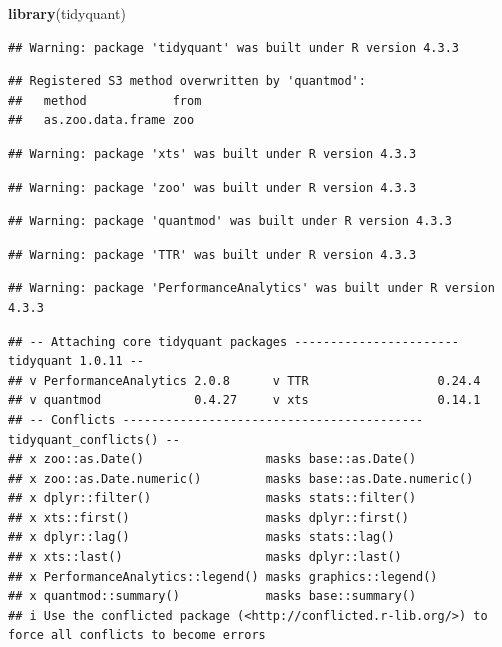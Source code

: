 \documentclass[
]{article}
\newenvironment{Shaded}{\begin{snugshade}}{\end{snugshade}}
\newcommand{\FunctionTok}[1]{\textcolor[rgb]{0.13,0.29,0.53}{\textbf{#1}}}
\newcommand{\NormalTok}[1]{#1}
\begin{document}
\begin{Shaded}
\begin{Highlighting}[]
\FunctionTok{library}\NormalTok{(tidyquant)}
\end{Highlighting}
\end{Shaded}

\begin{verbatim}
## Warning: package 'tidyquant' was built under R version 4.3.3
\end{verbatim}

\begin{verbatim}
## Registered S3 method overwritten by 'quantmod':
##   method            from
##   as.zoo.data.frame zoo
\end{verbatim}

\begin{verbatim}
## Warning: package 'xts' was built under R version 4.3.3
\end{verbatim}

\begin{verbatim}
## Warning: package 'zoo' was built under R version 4.3.3
\end{verbatim}

\begin{verbatim}
## Warning: package 'quantmod' was built under R version 4.3.3
\end{verbatim}

\begin{verbatim}
## Warning: package 'TTR' was built under R version 4.3.3
\end{verbatim}

\begin{verbatim}
## Warning: package 'PerformanceAnalytics' was built under R version 4.3.3
\end{verbatim}

\begin{verbatim}
## -- Attaching core tidyquant packages ----------------------- tidyquant 1.0.11 --
## v PerformanceAnalytics 2.0.8      v TTR                  0.24.4
## v quantmod             0.4.27     v xts                  0.14.1
## -- Conflicts ------------------------------------------ tidyquant_conflicts() --
## x zoo::as.Date()                 masks base::as.Date()
## x zoo::as.Date.numeric()         masks base::as.Date.numeric()
## x dplyr::filter()                masks stats::filter()
## x xts::first()                   masks dplyr::first()
## x dplyr::lag()                   masks stats::lag()
## x xts::last()                    masks dplyr::last()
## x PerformanceAnalytics::legend() masks graphics::legend()
## x quantmod::summary()            masks base::summary()
## i Use the conflicted package (<http://conflicted.r-lib.org/>) to force all conflicts to become errors
\end{verbatim}
\end{document}
